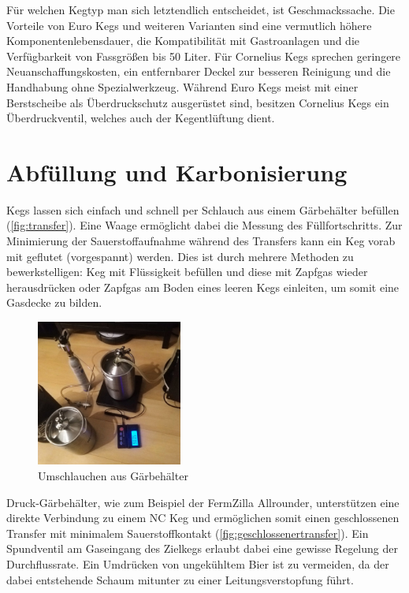 \documentclass[a4paper,parskip=half]{scrartcl}
\begin{document}
Für welchen Kegtyp man sich letztendlich entscheidet, ist Geschmackssache. Die Vorteile von Euro Kegs und weiteren Varianten sind eine vermutlich höhere Komponentenlebensdauer, die Kompatibilität mit Gastroanlagen und die Verfügbarkeit von Fassgrößen bis 50 Liter. Für Cornelius Kegs sprechen geringere Neuanschaffungskosten, ein entfernbarer Deckel zur besseren Reinigung und die Handhabung ohne Spezialwerkzeug. Während Euro Kegs meist mit einer Berstscheibe als Überdruckschutz ausgerüstet sind, besitzen Cornelius Kegs ein Überdruckventil, welches auch der Kegentlüftung dient.

\section*{Abfüllung und Karbonisierung}

Kegs lassen sich einfach und schnell per Schlauch aus einem Gärbehälter befüllen (\autoref{fig:transfer}). Eine Waage ermöglicht dabei die Messung des Füllfortschritts. Zur Minimierung der Sauerstoffaufnahme während des Transfers kann ein Keg vorab mit  geflutet (vorgespannt) werden. Dies ist durch mehrere Methoden zu bewerkstelligen: Keg mit Flüssigkeit befüllen und diese mit Zapfgas wieder herausdrücken oder Zapfgas am Boden eines leeren Kegs einleiten, um somit eine Gasdecke zu bilden.

\begin{figure}[h]
\centering
\includegraphics[width=4.8cm]{images/transfer.jpg}
\caption{Umschlauchen aus Gärbehälter}
\label{fig:transfer}
\end{figure}

Druck-Gärbehälter, wie zum Beispiel der FermZilla Allrounder, unterstützen eine direkte Verbindung zu einem NC Keg und ermöglichen somit einen geschlossenen Transfer mit minimalem Sauerstoffkontakt (\autoref{fig:geschlossenertransfer}). Ein Spundventil am Gaseingang des Zielkegs erlaubt dabei eine gewisse Regelung der Durchflussrate. Ein Umdrücken von ungekühltem Bier ist zu vermeiden, da der dabei entstehende Schaum mitunter zu einer Leitungsverstopfung führt.
\end{document}

